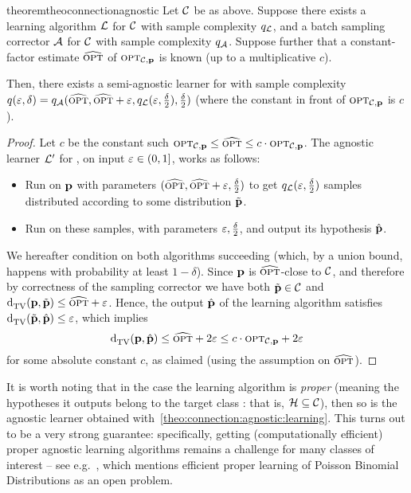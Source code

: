 \begin{restatable}{theorem}{theoconnectionagnostic}\label{theo:connection:agnostic:learning}
Let $\mathcal{C}$ be as above. Suppose there exists a learning algorithm $\mathcal{L}$ for $\mathcal{C}$ with sample complexity $q_\mathcal{L}$, and a batch sampling corrector $\mathcal{A}$ for $\mathcal{C}$ with sample complexity $q_\mathcal{A}$. Suppose further that a constant-factor estimate $\widehat{{\textsc{opt}}}$ of ${\textsc{opt}}_{\mathcal{C}, \mathbf{p}}$ is known (up to a multiplicative $c$).

Then, there exists a {semi-}agnostic learner for \class with sample complexity $q(\varepsilon,\delta)=q_\mathcal{A}(\widehat{{\textsc{opt}}},\widehat{{\textsc{opt}}}+\varepsilon, q_\mathcal{L}(\varepsilon,\frac{\delta}{2}),\frac{\delta}{2})$ (where the constant in front of ${\textsc{opt}}_{\mathcal{C}, \mathbf{p}}$ is $c$).
\end{restatable}
\begin{proof}
Let $c$ be the constant such ${\textsc{opt}}_{\mathcal{C},\mathbf{p}} \leq \widehat{{\textsc{opt}}}\leq c\cdot{\textsc{opt}}_{\mathcal{C},\mathbf{p}}$. The agnostic learner $\mathcal{L}^\prime$ for \property, on input $\varepsilon\in(0,1]$, works as follows:
\begin{itemize}[-]
  \item\label{theo:connection:agnostic:learning:step:1} Run \Algo on $\mathbf{p}$ with parameters $(\widehat{{\textsc{opt}}}, \widehat{{\textsc{opt}}}+\varepsilon,\frac{\delta}{2})$ to get $q_\mathcal{L}(\varepsilon,\frac{\delta}{2})$ samples distributed according to some distribution $\tilde{\mathbf{p}}$.
  \item Run \Learner on these samples, with parameters $\varepsilon,\frac{\delta}{2}$, and output its hypothesis $\hat{\mathbf{p}}$.
\end{itemize}
We hereafter condition on both algorithms succeeding (which, by a union bound, happens with probability at least $1-\delta$). Since $\mathbf{p}$  is $\widehat{{\textsc{opt}}}$-close to $\mathcal{C}$, and therefore by correctness of the sampling corrector we have both $\tilde{\mathbf{p}}\in\mathcal{C}$ and ${\operatorname{d}_{\rm{TV}}^{}\!\left({\mathbf{p}, \tilde{\mathbf{p}}}\right)} \leq \widehat{{\textsc{opt}}}+\varepsilon$. Hence, the output $\hat{\mathbf{p}}$ of the learning algorithm satisfies ${\operatorname{d}_{\rm{TV}}^{}\!\left({\tilde{\mathbf{p}}, \hat{\mathbf{p}}}\right)} \leq \varepsilon$, which implies
\begin{equation}
	{\operatorname{d}_{\rm{TV}}^{}\!\left({\ensuremath{\mathbf{p}}, \hat{\ensuremath{\mathbf{p}}}}\right)} \leq \widehat{{\textsc{opt}}} + 2\varepsilon \leq c\cdot{\textsc{opt}}_{\mathcal{C},\mathbf{p}} + 2\varepsilon \label{eq:connection:agnostic:learning}
\end{equation}
for some absolute constant $c$, as claimed (using the assumption on $\widehat{{\textsc{opt}}}$).
\end{proof}

It is worth noting that in the case the learning algorithm is \emph{proper} (meaning the hypotheses it outputs belong to the target class \class: that is, $\mathcal{H}\subseteq\mathcal{C}$), then so is the agnostic learner obtained with~\cref{theo:connection:agnostic:learning}. This turns out to be a very strong guarantee: specifically, getting (computationally efficient) proper agnostic learning algorithms remains a challenge for many classes of interest -- see e.g.~\cite{DDS:PBD:12}, which mentions efficient proper learning of Poisson Binomial Distributions as an open problem.

